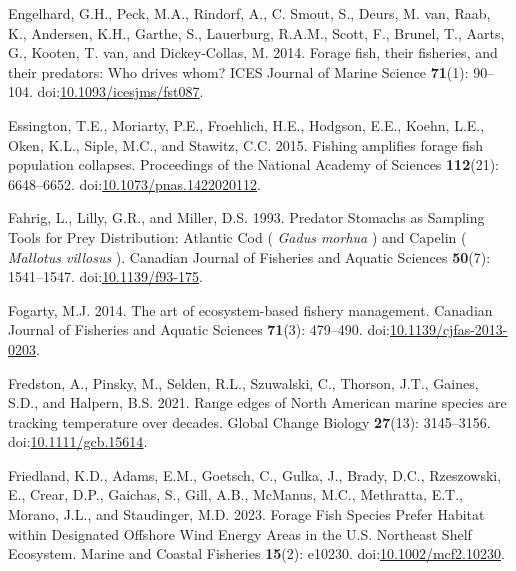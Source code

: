 \documentclass[
]{article}
\newlength{\cslhangindent}
\newlength{\cslentryspacingunit} %
\newenvironment{CSLReferences}[2] %
 {%
  \setlength{\parindent}{0pt}
  \ifodd #1
  \let\oldpar\par
  \def\par{\hangindent=\cslhangindent\oldpar}
  \fi
  \setlength{\parskip}{#2\cslentryspacingunit}
 }%
 {}
\begin{document}
\begin{CSLReferences}{1}{0}
\leavevmode{}%
Engelhard, G.H., Peck, M.A., Rindorf, A., C. Smout, S., Deurs, M. van, Raab, K., Andersen, K.H., Garthe, S., Lauerburg, R.A.M., Scott, F., Brunel, T., Aarts, G., Kooten, T. van, and Dickey-Collas, M. 2014. Forage fish, their fisheries, and their predators: Who drives whom? ICES Journal of Marine Science \textbf{71}(1): 90--104. doi:\href{https://doi.org/10.1093/icesjms/fst087}{10.1093/icesjms/fst087}.

\leavevmode{}%
Essington, T.E., Moriarty, P.E., Froehlich, H.E., Hodgson, E.E., Koehn, L.E., Oken, K.L., Siple, M.C., and Stawitz, C.C. 2015. Fishing amplifies forage fish population collapses. Proceedings of the National Academy of Sciences \textbf{112}(21): 6648--6652. doi:\href{https://doi.org/10.1073/pnas.1422020112}{10.1073/pnas.1422020112}.

\leavevmode{}%
Fahrig, L., Lilly, G.R., and Miller, D.S. 1993. Predator {Stomachs} as {Sampling} {Tools} for {Prey} {Distribution}: {Atlantic} {Cod} ( \emph{{Gadus} morhua} ) and {Capelin} ( \emph{{Mallotus} villosus} ). Canadian Journal of Fisheries and Aquatic Sciences \textbf{50}(7): 1541--1547. doi:\href{https://doi.org/10.1139/f93-175}{10.1139/f93-175}.

\leavevmode{}%
Fogarty, M.J. 2014. The art of ecosystem-based fishery management. Canadian Journal of Fisheries and Aquatic Sciences \textbf{71}(3): 479--490. doi:\href{https://doi.org/10.1139/cjfas-2013-0203}{10.1139/cjfas-2013-0203}.

\leavevmode{}%
Fredston, A., Pinsky, M., Selden, R.L., Szuwalski, C., Thorson, J.T., Gaines, S.D., and Halpern, B.S. 2021. Range edges of {North} {American} marine species are tracking temperature over decades. Global Change Biology \textbf{27}(13): 3145--3156. doi:\href{https://doi.org/10.1111/gcb.15614}{10.1111/gcb.15614}.

\leavevmode{}%
Friedland, K.D., Adams, E.M., Goetsch, C., Gulka, J., Brady, D.C., Rzeszowski, E., Crear, D.P., Gaichas, S., Gill, A.B., McManus, M.C., Methratta, E.T., Morano, J.L., and Staudinger, M.D. 2023. Forage {Fish} {Species} {Prefer} {Habitat} within {Designated} {Offshore} {Wind} {Energy} {Areas} in the {U}.{S}. {Northeast} {Shelf} {Ecosystem}. Marine and Coastal Fisheries \textbf{15}(2): e10230. doi:\href{https://doi.org/10.1002/mcf2.10230}{10.1002/mcf2.10230}.


\end{CSLReferences}
\end{document}
